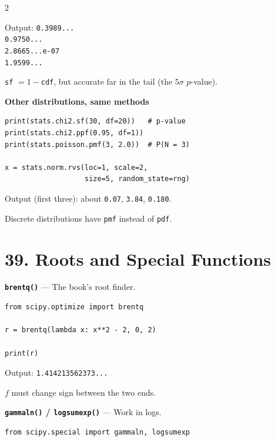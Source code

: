 \documentclass[10pt,a4paper]{article}
\begin{document}
\begin{multicols}{2}
\begin{card}
Output:
\texttt{0.3989...}\\
\texttt{0.9750...}\\
\texttt{2.8665...e-07}\\
\texttt{1.9599...}

\texttt{sf} $=1-$\texttt{cdf}, but accurate far in the tail (the $5\sigma$
$p$-value).
\end{card}

\begin{card}
\textbf{Other distributions, same methods}

\begin{lstlisting}[style=pythonstyle]
print(stats.chi2.sf(30, df=20))   # p-value
print(stats.chi2.ppf(0.95, df=1))
print(stats.poisson.pmf(3, 2.0))  # P(N = 3)

x = stats.norm.rvs(loc=1, scale=2,
                   size=5, random_state=rng)
\end{lstlisting}

Output (first three):
about \texttt{0.07}, \texttt{3.84}, \texttt{0.180}.

Discrete distributions have \texttt{pmf} instead of \texttt{pdf}.
\end{card}

\section*{39. Roots and Special Functions}

\begin{card}
\textbf{\texttt{brentq()}} --- The book's root finder.

\begin{lstlisting}[style=pythonstyle]
from scipy.optimize import brentq

r = brentq(lambda x: x**2 - 2, 0, 2)

print(r)
\end{lstlisting}

Output: \texttt{1.414213562373...}

$f$ must change sign between the two ends.
\end{card}

\begin{card}
\textbf{\texttt{gammaln()} / \texttt{logsumexp()}} --- Work in logs.

\begin{lstlisting}[style=pythonstyle]
from scipy.special import gammaln, logsumexp


\end{lstlisting}
\end{card}
\end{multicols}
\end{document}
